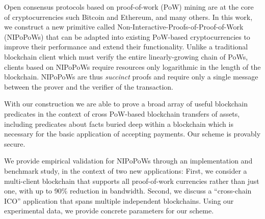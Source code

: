 Open consensus protocols based on proof-of-work (PoW) mining are at the core of
cryptocurrencies such Bitcoin and Ethereum, and many others. In this
work, we construct a new primitive called
Non-Interactive-Proofs-of-Proof-of-Work (NIPoPoWs) that can be adapted into
existing PoW-based cryptocurrencies to improve their performance and extend
their functionality. Unlike a traditional blockchain client which must verify
the entire linearly-growing chain of PoWs, clients based on NIPoPoWs require
resources only logarithmic in the length of the blockchain. NIPoPoWs are thus
\emph{succinct} proofs and require only a single message between the prover and
the verifier of the transaction.

With our construction we are able to prove a broad array of useful blockchain
predicates in the context of cross PoW-based blockchain transfers of assets,
including predicates about facts buried deep within a blockchain which is
necessary for the basic application of accepting payments. Our scheme is
provably secure.

We provide empirical validation for NIPoPoWs through an implementation and
benchmark study, in the context of two new applications: First, we consider a
multi-client blockchain that supports all proof-of-work currencies rather than
just one, with up to 90\% reduction in bandwidth.  Second, we discuss a
``cross-chain ICO'' application that spans multiple independent blockchains.
Using our experimental data, we provide concrete parameters for our scheme.

